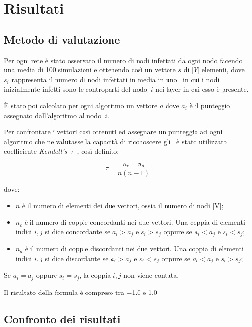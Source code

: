 \chapter{Risultati}

\section{Metodo di valutazione}

Per ogni rete è stato osservato il numero di nodi infettati da ogni nodo facendo una media di \num{100} simulazioni e 
ottenendo così un vettore $s$ di $|V|$ elementi, dove $s_i$ rappresenta il numero di nodi 
infettati in media in uno \spproc\ in cui i nodi inizialmente infetti sono le controparti del 
nodo~$i$ nei layer in cui esso è presente.

È stato poi calcolato per ogni algoritmo un vettore $a$ dove $a_i$ 
è il punteggio assegnato dall'algoritmo al nodo~$i$.

Per confrontare i vettori così ottenuti ed assegnare un punteggio ad ogni algoritmo che ne 
valutasse la capacità di riconoscere gli \infsp\ è stato utilizzato coefficiente \textit{Kendall's}~$\tau$~\cite{kendall:tau}, 
così definito:

\begin{equation}
    \tau = \frac{n_c - n_d}{n(n-1)}
\end{equation}

dove:
\begin{itemize}
    \item $n$ è il numero di elementi dei due vettori, ossia il numero di nodi |V|;
    \item $n_c$ è il numero di coppie concordanti nei due vettori. Una coppia di elementi 
            indici $i, j$ si dice concordante se $a_i > a_j$ e $s_i > s_j$ oppure se $a_i < a_j$ e $s_i < s_j$;
    \item $n_d$ è il numero di coppie discordanti nei due vettori. Una coppia di elementi 
    indici $i, j$ si dice discordante se $a_i > a_j$ e $s_i < s_j$ oppure se $a_i < a_j$ e $s_i > s_j$;    
\end{itemize}

Se $a_i = a_j$ oppure $s_i = s_j$, la coppia $i, j$ non viene contata.

Il risultato della formula è compreso tra \num{-1.0} e {1.0}

\section{Confronto dei risultati}

